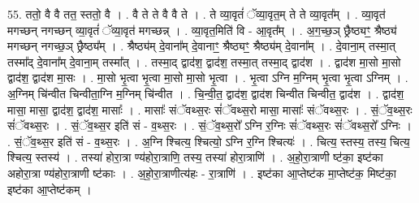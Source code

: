 \documentclass[17pt]{extarticle}
\begin{document}
55. ततो॒ वै वै तत॒ स्ततो॒ वै । . वै ते ते वै वै ते । . ते व्या॒वृतं॑ ॅव्या॒वृत॒म् ते ते व्या॒वृत᳚म् । . व्या॒वृत॑ मगच्छन् नगच्छन् व्या॒वृतं॑ ॅव्या॒वृत॑ मगच्छन्न् । . व्या॒वृत॒मिति॑ वि - आ॒वृत᳚म् । . अ॒ग॒च्छ॒ञ् छ्रैष्ठ्यꣳ॒॒ श्रैष्ठ्य॑ मगच्छन् नगच्छ॒ञ् छ्रैष्ठ्य᳚म् । . श्रैष्ठ्य॑म् दे॒वाना᳚म् दे॒वानाꣳ॒॒ श्रैष्ठ्यꣳ॒॒ श्रैष्ठ्य॑म् दे॒वाना᳚म् । . दे॒वाना॒म् तस्मा॒त् तस्मा᳚द् दे॒वाना᳚म् दे॒वाना॒म् तस्मा᳚त् । . तस्मा॒द् द्वाद॑श॒ द्वाद॑श॒ तस्मा॒त् तस्मा॒द् द्वाद॑श । . द्वाद॑श मा॒सो मा॒सो द्वाद॑श॒ द्वाद॑श मा॒सः । . मा॒सो भृ॒त्वा भृ॒त्वा मा॒सो मा॒सो भृ॒त्वा । . भृ॒त्वा ऽग्नि म॒ग्निम् भृ॒त्वा भृ॒त्वा ऽग्निम् । . अ॒ग्निम् चि॑न्वीत चिन्वीता॒ग्नि म॒ग्निम् चि॑न्वीत । . चि॒न्वी॒त॒ द्वाद॑श॒ द्वाद॑श चिन्वीत चिन्वीत॒ द्वाद॑श । . द्वाद॑श॒ मासा॒ मासा॒ द्वाद॑श॒ द्वाद॑श॒ मासाः᳚ । . मासाः᳚ संॅवथ्स॒रः सं॑ॅवथ्स॒रो मासा॒ मासाः᳚ संॅवथ्स॒रः । . सं॒ॅव॒थ्स॒रः सं॑ॅवथ्स॒रः । . सं॒ॅव॒थ्स॒र इति॑ सं - व॒थ्स॒रः । . सं॒ॅव॒थ्स॒रो᳚ ऽग्नि र॒ग्निः सं॑ॅवथ्स॒रः सं॑ॅवथ्स॒रो᳚ ऽग्निः । . सं॒ॅव॒थ्स॒र इति॑ सं - व॒थ्स॒रः । . अ॒ग्नि श्चित्य॒ श्चित्यो॒ ऽग्नि र॒ग्नि श्चित्यः॑ । . चित्य॒ स्तस्य॒ तस्य॒ चित्य॒ श्चित्य॒ स्तस्य॑ । . तस्या॑ होरा॒त्रा ण्य॑होरा॒त्राणि॒ तस्य॒ तस्या॑ होरा॒त्राणि॑ । . अ॒हो॒रा॒त्राणी ष्ट॑का॒ इष्ट॑का अहोरा॒त्रा ण्य॑होरा॒त्राणी ष्ट॑काः । . अ॒हो॒रा॒त्राणीत्य॑हः - रा॒त्राणि॑ । . इष्ट॑का आ॒प्तेष्ट॑क मा॒प्तेष्ट॑क॒ मिष्ट॑का॒ इष्ट॑का आ॒प्तेष्ट॑कम् । \newline
\end{document}
